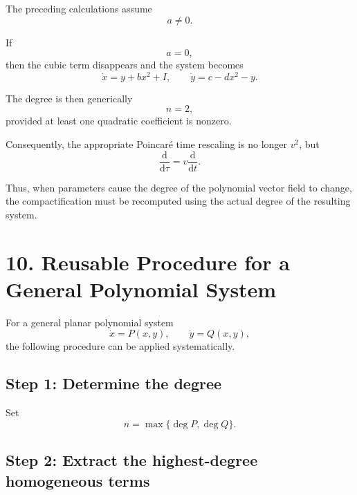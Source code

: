 \documentclass[11pt,a4paper]{article}
\newcommand{\dd}{\mathrm{d}}
\begin{document}
The preceding calculations assume
\begin{equation}
a\neq0.
\end{equation}

If
\begin{equation}
a=0,
\end{equation}
then the cubic term disappears and the system becomes
\begin{equation}
\dot x=y+bx^2+I,
\qquad
\dot y=c-dx^2-y.
\end{equation}

The degree is then generically
\begin{equation}
\boxed{
n=2,
}
\end{equation}
provided at least one quadratic coefficient is nonzero.

Consequently, the appropriate Poincaré time rescaling is no longer
$v^2$, but
\begin{equation}
\boxed{
\frac{\dd}{\dd\tau}
=
v\frac{\dd}{\dd t}.
}
\end{equation}

Thus, when parameters cause the degree of the polynomial vector field
to change, the compactification must be recomputed using the actual
degree of the resulting system.

\section{10. Reusable Procedure for a General Polynomial System}

For a general planar polynomial system
\begin{equation}
\dot x=P(x,y),
\qquad
\dot y=Q(x,y),
\end{equation}
the following procedure can be applied systematically.

\subsection*{Step 1: Determine the degree}

Set
\begin{equation}
n=\max\{\deg P,\deg Q\}.
\end{equation}

\subsection*{Step 2: Extract the highest-degree homogeneous terms}
\end{document}
